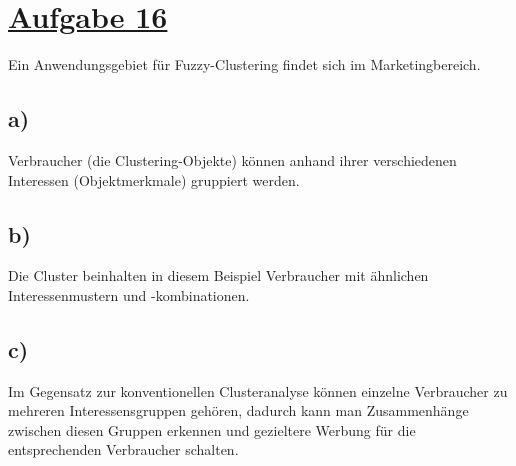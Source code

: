 \section*{\underline{Aufgabe 16}}

Ein Anwendungsgebiet für Fuzzy-Clustering findet sich im Marketingbereich.

\subsection*{a)}

Verbraucher (die Clustering-Objekte) können anhand ihrer verschiedenen Interessen (Objektmerkmale) gruppiert werden.

\subsection*{b)}

Die Cluster beinhalten in diesem Beispiel Verbraucher mit ähnlichen Interessenmustern und -kombinationen.

\subsection*{c)}

Im Gegensatz zur konventionellen Clusteranalyse können einzelne Verbraucher zu mehreren Interessensgruppen gehören, dadurch kann man Zusammenhänge zwischen diesen Gruppen erkennen und gezieltere Werbung für die entsprechenden Verbraucher schalten.